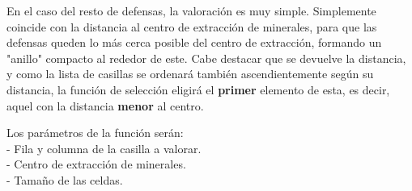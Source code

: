 
En el caso del resto de defensas, la valoración es muy simple. Simplemente coincide con la distancia al centro de extracción de minerales, para que las defensas queden lo más cerca posible del centro de extracción, formando un "anillo" compacto al rededor de este. Cabe destacar que se devuelve la distancia, y como la lista de casillas se ordenará también ascendientemente según su distancia, la función de selección eligirá el \textbf{primer} elemento de esta, es decir, aquel con la distancia \textbf{menor} al centro.

Los parámetros de la función serán:\\
	- Fila y columna de la casilla a valorar.\\
	- Centro de extracción de minerales.\\
	- Tamaño de las celdas.\\
